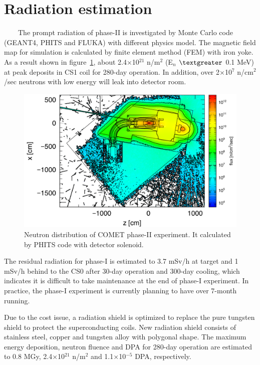 \documentclass[a4paper, 10pt, twocolumn]{article}
\begin{document}
\section{Radiation estimation}
~~~~The prompt radiation of phase-II is investigated by Monte Carlo code (GEANT4\cite{geant}, PHITS and FLUKA\cite{fluka}) with different physics model.
The magnetic field map for simulation is calculated by finite element method (FEM) with iron yoke.
As a result shown in figure~\ref{geo}, about 2.4$\times$10$^{21}$ n/m$^2$ (E$_n$ $\textgreater$ 0.1 MeV) at peak deposits in CS1 coil for 280-day operation.
In addition, over 2$\times$10$^7$ n/cm$^2$/sec neutrons with low energy will leak into detector room.
\begin{figure}[H]
 \centering
 \includegraphics[scale=0.3]{fig/neutron.pdf}
 \caption{Neutron distribution of COMET phase-II experiment. It calculated by PHITS code with detector solenoid.}
 \label{geo}
\end{figure}
The residual radiation for phase-I is estimated to 3.7 mSv/h at target and 1 mSv/h behind to the CS0 after 30-day operation and 300-day cooling, which indicates it is difficult to take maintenance at the end of phase-I experiment.
In practice, the phase-I experiment is currently planning to have over 7-month running.

Due to the cost issue, a radiation shield is optimized to replace the pure tungsten shield to protect the superconducting coils.
New radiation shield consists of stainless steel, copper and tungsten alloy with polygonal shape.
The maximum energy deposition, neutron fluence and DPA for 280-day operation are estimated to 0.8 MGy, 2.4$\times$10$^{21}$ n/m$^2$ and 1.1$\times$10$^{-5}$ DPA, respectively.
\end{document}
